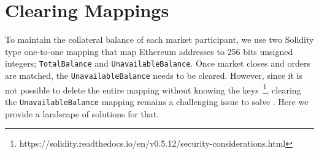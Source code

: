 
\section{Clearing Mappings}



To maintain the collateral balance of each market participant, we use two Solidity type one-to-one mapping that map Ethereum addresses to 256 bits unsigned integers; \texttt{TotalBalance} and \texttt{UnavailableBalance}. Once market closes and orders are matched, the \texttt{UnavailableBalance} needs to be cleared. However, since it is not possible to delete the entire mapping without knowing the keys~\footnote{https://solidity.readthedocs.io/en/v0.5.12/security-considerations.html}, clearing the \texttt{UnavailableBalance} mapping remains a challenging issue to solve . Here we provide a landscape of solutions for that.

